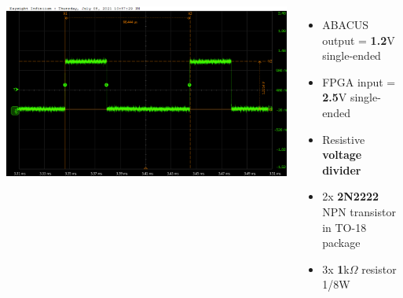 \documentclass[aspectratio=169]{beamer}
\begin{document}
\begin{frame}
\begin{columns}
\begin{center}
			\includegraphics[width=0.5 \textwidth]{IMG/probe/09-08-2021_clock-specks.png}
		\end{center}
		\begin{itemize}
			\item ABACUS output = \textbf{1.2}V single-ended
			\item FPGA input = \textbf{2.5}V single-ended
			\item Resistive \textbf{voltage divider}
			\item 2x \textbf{2N2222} NPN transistor in TO-18 package
			\item 3x \textbf{1}k$\Omega$ resistor 1/8W
		\end{itemize}
	\end{columns}
	\end{frame}
\end{document}
